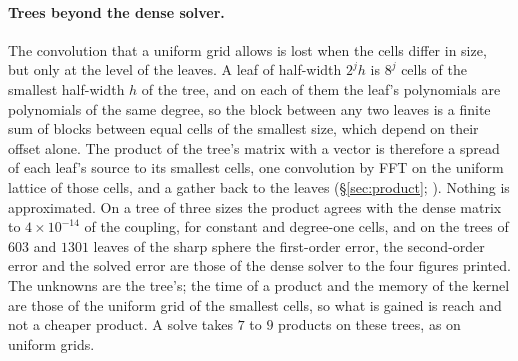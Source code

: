 \documentclass[11pt,a4paper]{article}
\begin{document}
\paragraph{Trees beyond the dense solver.} The convolution that a uniform grid allows is lost when the
cells differ in size, but only at the level of the leaves. A leaf of half-width $2^jh$ is $8^j$ cells
of the smallest half-width $h$ of the tree, and on each of them the leaf's polynomials are polynomials
of the same degree, so the block between any two leaves is a finite sum of blocks between equal cells of
the smallest size, which depend on their offset alone. The product of the tree's matrix with a vector is
therefore a spread of each leaf's source to its smallest cells, one convolution by FFT on the uniform
lattice of those cells, and a gather back to the leaves (\S\ref{sec:product};
). Nothing is approximated. On a tree of three sizes
the product agrees with the dense matrix to $4\times10^{-14}$ of the coupling, for constant and
degree-one cells, and on the trees of $603$ and $1301$ leaves of the sharp sphere the first-order error, the
second-order error and the solved error are those of the dense solver to the four figures printed. The
unknowns are the tree's; the time of a product and the memory of the kernel are those of the uniform
grid of the smallest cells, so what is gained is reach and not a cheaper product. A solve takes $7$ to
$9$ products on these trees, as on uniform grids.
\end{document}
